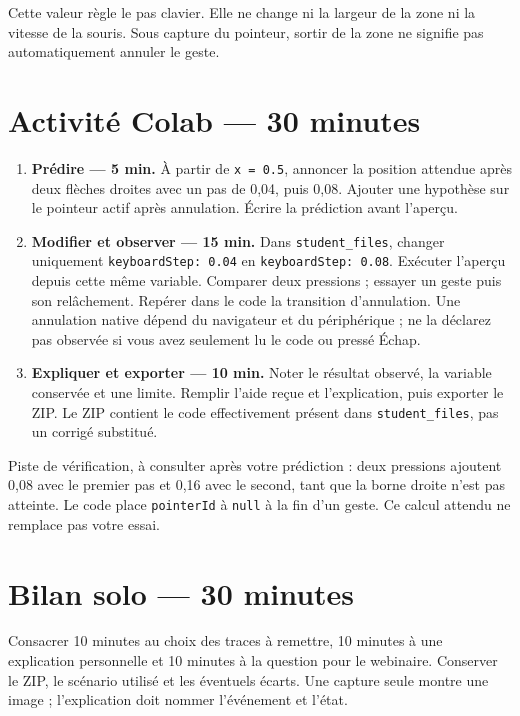 \documentclass[
  canadien,
  11pt,
  a4paper,
]{report}
\providecommand{\tightlist}{%
  \setlength{\itemsep}{0pt}\setlength{\parskip}{0pt}}
\begin{document}
Cette valeur règle le pas clavier. Elle ne change ni la largeur de la
zone ni la vitesse de la souris. Sous capture du pointeur, sortir de la
zone ne signifie pas automatiquement annuler le geste.

\section{Activité Colab --- 30
minutes}\label{activituxe9-colab-30-minutes}

\begin{enumerate}
\def\labelenumi{\arabic{enumi}.}
\tightlist
\item
  \textbf{Prédire --- 5 min.} À partir de \texttt{x\ =\ 0.5}, annoncer
  la position attendue après deux flèches droites avec un pas de 0,04,
  puis 0,08. Ajouter une hypothèse sur le pointeur actif après
  annulation. Écrire la prédiction avant l'aperçu.
\item
  \textbf{Modifier et observer --- 15 min.} Dans
  \texttt{student\_\allowbreak{}files}, changer uniquement
  \texttt{keyboard\allowbreak{}Step:\ 0.04} en \texttt{keyboard\allowbreak{}Step:\ 0.08}. Exécuter
  l'aperçu depuis cette même variable. Comparer deux pressions ; essayer
  un geste puis son relâchement. Repérer dans le code la transition
  d'annulation. Une annulation native dépend du navigateur et du
  périphérique ; ne la déclarez pas observée si vous avez seulement lu
  le code ou pressé Échap.
\item
  \textbf{Expliquer et exporter --- 10 min.} Noter le résultat observé,
  la variable conservée et une limite. Remplir l'aide reçue et
  l'explication, puis exporter le ZIP. Le ZIP contient le code
  effectivement présent dans \texttt{student\_\allowbreak{}files}, pas un corrigé
  substitué.
\end{enumerate}

Piste de vérification, à consulter après votre prédiction : deux
pressions ajoutent 0,08 avec le premier pas et 0,16 avec le second, tant
que la borne droite n'est pas atteinte. Le code place \texttt{pointer\allowbreak{}Id}
à \texttt{null} à la fin d'un geste. Ce calcul attendu ne remplace pas
votre essai.

\section{Bilan solo --- 30 minutes}\label{bilan-solo-30-minutes}

Consacrer 10 minutes au choix des traces à remettre, 10 minutes à une
explication personnelle et 10 minutes à la question pour le webinaire.
Conserver le ZIP, le scénario utilisé et les éventuels écarts. Une
capture seule montre une image ; l'explication doit nommer l'événement
et l'état.
\end{document}

